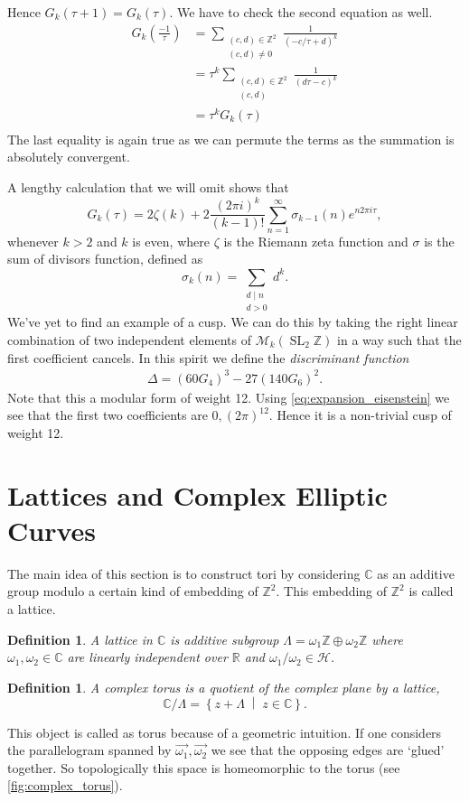 \documentclass[a4paper]{article}
\theoremstyle{theoremdd}
\theoremstyle{definitiondd}
\newtheorem{definition}[theorem]{Definition}
\theoremstyle{remarkdd}
\newcommand{\Z}{\mathbb{Z}}
\newcommand{\C}{\mathbb{C}}
\newcommand{\R}{\mathbb{R}}
\newcommand{\bigset}[2]{ \left\{ #1 \;\middle|\; #2 \right\} }
\DeclareMathOperator{\SL}{SL}
\begin{document}
Hence $G_k(\tau + 1) = G_k(\tau)$.
We have to check the second equation as well.
\begin{align*}
	G_k\left(\frac{-1}{\tau}\right) &=  \sum_{\substack{(c,d) \in \Z^2 \\ (c,d) \ne 0}} \frac{1}{(-c / \tau + d)^{k}}\\
			     &= \tau^{k} \sum_{\substack{(c, d) \in \Z^2 \\ (c,d)}} \frac{1}{(d \tau - c)^{k}} \\
			     &= \tau^{k}G_k(\tau) \\
\end{align*}
The last equality is again true as we can permute the terms as the summation is absolutely convergent.

A lengthy calculation that we will omit shows that \begin{equation}\label{eq:expansion_eisenstein}
	G_k(\tau) = 2 \zeta(k) + 2 \frac{(2\pi i)^{k}}{(k-1)!}\sum_{n = 1}^{\infty} \sigma_{k-1}(n)  e^{n 2 \pi i \tau}
,\end{equation}
whenever $ k>2$ and $k$ is even, where $\zeta$ is the Riemann zeta function and $\sigma$ is the sum of divisors function, defined as
\[
	\sigma_{k}(n) = \sum_{\substack{d \mathbin | n \\ d > 0}} d^{k}
.\] 
We've yet to find an example of a cusp. We can do this by taking the right linear combination of two independent elements of $\mathcal{M} _k(\SL_2\Z)$ in a way such that the first coefficient cancels.
In this spirit we define the \emph{discriminant function}
\begin{align*}
	\Delta = (60 G_4)^3 - 27(140G_6)^2
.\end{align*}
Note that this a modular form of weight 12. 
Using \cref{eq:expansion_eisenstein} we see that the first two coefficients are $0, (2 \pi)^{12}$. 
Hence it is a non-trivial cusp of weight 12. 

\section{Lattices and Complex Elliptic Curves}
The main idea of this section is to construct tori by considering $\C$ as an additive group modulo a certain kind of embedding of $\Z^2$. This embedding of $\Z^2$ is called a lattice.  
\begin{definition}
	A \emph{lattice in $\C$} is additive subgroup $\Lambda = \omega_1 \Z \oplus \omega_2 \Z$ where $\omega_1, \omega_2 \in \C$ are linearly independent over $\R$ and $\omega_1 / \omega_2  \in \mathcal{H}$.
\end{definition}
\begin{definition}
	A \emph{complex torus} is a quotient of the complex plane by a lattice, \[
		\C / \Lambda = \bigset{z + \Lambda}{z \in \C} 
	.\] 
\end{definition}
This object is called as torus because of a geometric intuition. 
If one considers the parallelogram spanned by $\vec{\omega_1}, \vec{\omega_2}$ we see that the opposing edges are `glued' together. 
So topologically this space is homeomorphic to the torus (see \cref{fig:complex_torus}). 
\end{document}
